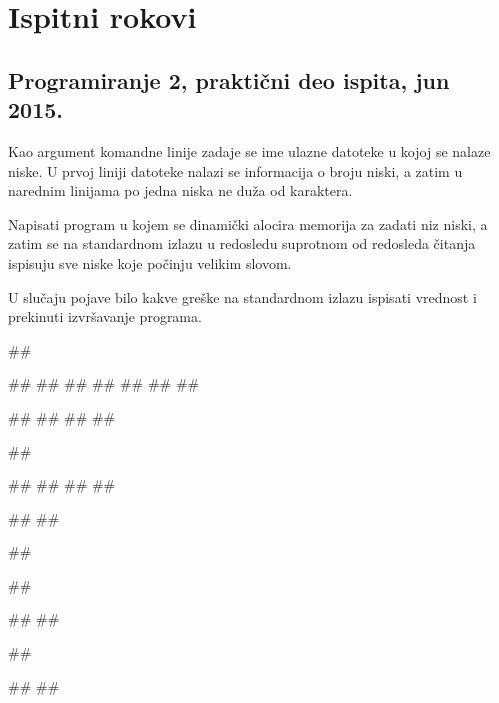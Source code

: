 \chapter{Ispitni rokovi}

\section{Programiranje 2, praktični deo ispita, jun 2015.}

\begin{Exercise}[label=901]
Kao argument komandne linije zadaje se ime ulazne datoteke u kojoj se nalaze niske. U prvoj liniji datoteke nalazi se informacija o broju niski, a zatim u narednim linijama po jedna niska ne duža od  karaktera.
  
Napisati program u kojem se dinamički alocira memorija za zadati niz niski, a zatim se na standardnom izlazu u redosledu suprotnom od redosleda čitanja ispisuju sve niske koje počinju velikim slovom. 

U slučaju pojave bilo kakve greške na standardnom izlazu ispisati vrednost  i prekinuti izvršavanje programa.

\begin{miditest}
\begin{upotreba}{1}
##

##
##
##
##
##
##
##

#\naslovInt#
##
##
##
\end{upotreba}
\end{miditest}
\begin{minitest}
\begin{upotreba}{2}
##

##
##
##
##

#\naslovInt#
#\izlaz{}#
\end{upotreba}
\end{minitest}


\begin{minitest}
\begin{upotreba}{3}
##

##

#\naslovInt#
##
\end{upotreba}
\end{minitest}
\begin{minitest}
\begin{upotreba}{4}
##

#\naslovInt#
##
\end{upotreba}
\end{minitest}

\end{Exercise}
\begin{Answer}[ref=901]
\end{Answer}


